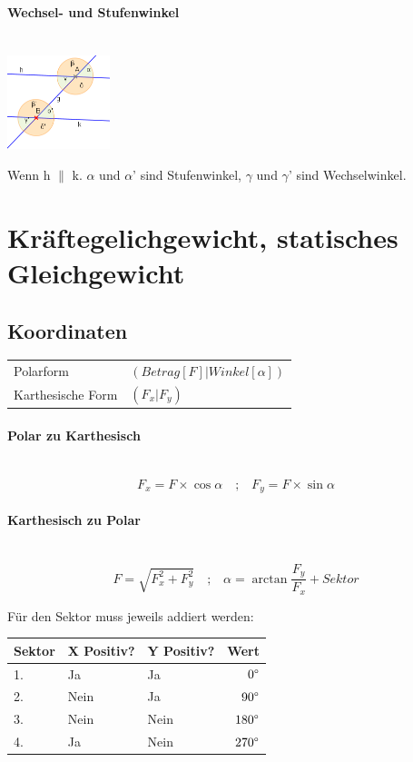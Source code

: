 \documentclass[a4paper,10pt]{article}
\newcommand{\lbparagraph}[1]{\paragraph{#1}\mbox{}\\}
\newcommand{\eqsp}[1]{\quad\textbf{;}\quad}
\begin{document}
\lbparagraph{Wechsel- und Stufenwinkel}

\includegraphics[height=103px,keepaspectratio]{stufen-wechselwinkel}

Wenn h $\parallel$ k. $\alpha$ und $\alpha$' sind Stufenwinkel, $\gamma$ und $\gamma$' sind Wechselwinkel.

%

\section{Kräftegelichgewicht, statisches Gleichgewicht}

\subsection{Koordinaten}

\begin{tabular}{l l}
    Polarform & $(Betrag[F]|Winkel[\alpha])$ \\
    Karthesische Form & $(F_x|F_y)$
\end{tabular}

\lbparagraph{Polar zu Karthesisch}

\begin{equation}
    F_x = F \times \cos{\alpha}
    \eqsp{}
    F_y = F \times \sin{\alpha}
\end{equation}

\lbparagraph{Karthesisch zu Polar}

\begin{equation}
    F = \sqrt{F_x^2 + F_y^2}
    \eqsp{}
    \alpha = \arctan{\frac{F_y}{F_x}} + Sektor
\end{equation}

Für den Sektor muss jeweils addiert werden:

\begin{tabular}{l|l|l|r}
    Sektor & X Positiv? & Y Positiv? & Wert \\
    \hline
    1. & Ja & Ja & $0\degree$ \\
    2. & Nein & Ja & $90\degree$ \\
    3. & Nein & Nein & $180\degree$ \\
    4. & Ja & Nein & $270\degree$
\end{tabular}
\end{document}
